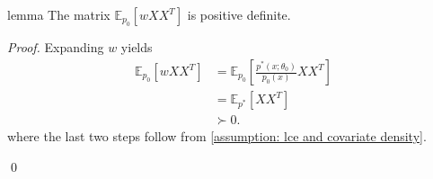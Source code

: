 \documentclass[11pt]{article}
\begin{document}





\begin{restatable}{lemma}{} \label{lemma: pd}
    The matrix $\mathbb{E}_{p_0}[wXX^T]$ is positive definite.
\end{restatable}
\noindent \textit{Proof.} Expanding $w$ yields
\begin{align}
    \mathbb{E}_{p_0}[wXX^T] &= \mathbb{E}_{p_0}\left[\frac{p^*(x;\theta_0)}{p_0(x)}XX^T\right] \\
    &= \mathbb{E}_{p^*}\left[XX^T\right] \\
    &\succ 0.
\end{align}
where the last two steps follow from \cref{assumption: lce and covariate density}.

\qed{}
\end{document}
